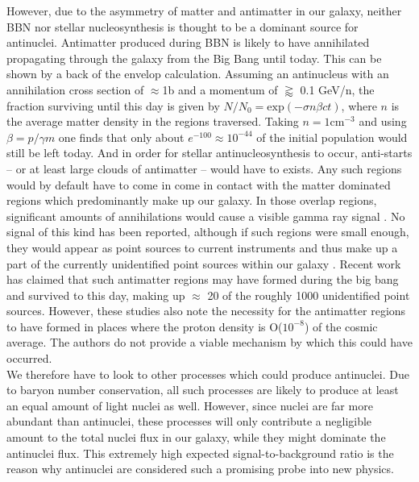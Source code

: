 However, due to the asymmetry of matter and antimatter in our galaxy, neither BBN nor stellar nucleosynthesis is thought to be a dominant source for antinuclei. Antimatter produced during BBN is likely to have annihilated propagating through the galaxy from the Big Bang until today. This can be shown by a back of the envelop calculation. Assuming an antinucleus with an annihilation cross section of $\approx$1b and a momentum of $\gtrapprox$ 0.1 GeV/n, the fraction surviving until this day is given by $N/N_0 = \mathrm{exp}(-\sigma n \beta c t)$, where $n$ is the average matter density in the regions traversed. Taking $n = 1 \mathrm{cm}^{-3}$ and using $\beta = p/\gamma m$ one finds that only about $e^{-100} \approx 10^{-44}$ of the initial population would still be left today.  And in order for stellar antinucleosynthesis to occur, anti-starts -- or at least large clouds of antimatter -- would have to exists. Any such regions would by default have to come in come in contact with the matter dominated regions which predominantly make up our galaxy. In those overlap regions, significant amounts of annihilations would cause a visible gamma ray signal \cite{}.  No signal of this kind has been reported, although if such regions were small enough, they would appear as point sources to current instruments and thus make up a part of the currently unidentified point sources within our galaxy \cite{Fermi Lat point source catalogue}. Recent work has claimed that such antimatter regions may have formed during the big bang and survived to this day\cite{}, making up $\approx$ 20 of the roughly 1000 unidentified point sources. However, these studies also note the necessity for the antimatter regions to have formed in places where the proton density is O($10^{-8}$) of the cosmic average.  The authors do not provide a viable mechanism by which this could have occurred. \\
We therefore have to look to other processes which could produce antinuclei. Due to baryon number conservation, all such processes are likely to produce at least an equal amount of light nuclei as well. However, since nuclei are far more abundant than antinuclei, these processes will only contribute a negligible amount to the total nuclei flux in our galaxy, while they might dominate the antinuclei flux. This extremely high expected signal-to-background ratio is the reason why antinuclei are considered such a promising probe into new physics.

